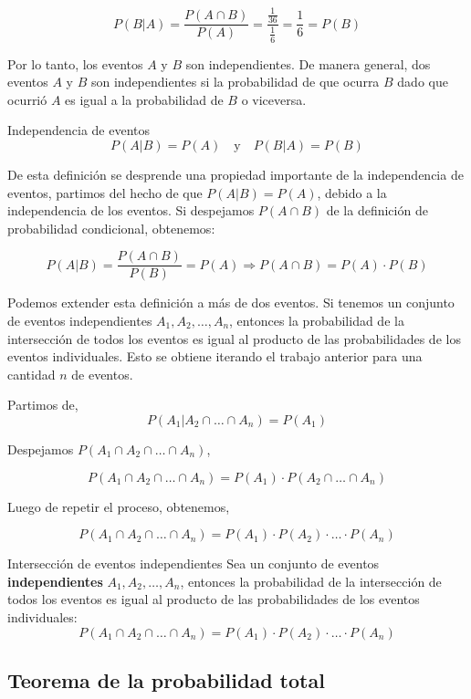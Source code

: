 $$ 
  P(B|A) = \frac{P(A \cap B)}{P(A)} = \frac{\frac{1}{36}}{\frac{1}{6}} = \frac{1}{6} = P(B)
$$

Por lo tanto, los eventos $A$ y $B$ son independientes. De manera general, dos eventos $A$ y $B$ son independientes si la probabilidad de que ocurra $B$ dado que ocurrió $A$ es igual a la probabilidad de $B$ o viceversa. 

\begin{definicion}{Independencia de eventos}
  \[
    P(A|B) = P(A) \quad \text{y} \quad P(B|A) = P(B)
  \]
\end{definicion}

De esta definición se desprende una propiedad importante de la independencia de eventos, partimos del hecho de que $P(A|B) = P(A)$, debido a la independencia de los eventos. Si despejamos $P(A \cap B)$ de la definición de probabilidad condicional, obtenemos:

\[
  P(A|B) = \frac{P(A \cap B)}{P(B)} = P(A) \Rightarrow P(A \cap B) = P(A) \cdot P(B)
\]

Podemos extender esta definición a más de dos eventos. Si tenemos un conjunto de eventos independientes $A_1, A_2, \ldots, A_n$, entonces la probabilidad de la intersección de todos los eventos es igual al producto de las probabilidades de los eventos individuales. Esto se obtiene 
iterando el trabajo anterior para una cantidad $n$ de eventos. 

Partimos de,
\[
  P(A_1|A_2 \cap \ldots \cap A_n) = P(A_1)
\]

Despejamos $P(A_1 \cap A_2 \cap \ldots \cap A_n)$,

\[
  P(A_1 \cap A_2 \cap \ldots \cap A_n) = P(A_1) \cdot P(A_2 \cap \ldots \cap A_n)
\]

Luego de repetir el proceso, obtenemos,

\[
  P(A_1 \cap A_2 \cap \ldots \cap A_n) = P(A_1) \cdot P(A_2) \cdot \ldots \cdot P(A_n)
\]

\begin{definicion}{Intersección de eventos independientes}
  Sea un conjunto de eventos \textbf{independientes} $A_1, A_2, \ldots, A_n$, entonces la probabilidad de la intersección de todos los eventos es igual al producto de las probabilidades de los eventos individuales:
  \[
    P(A_1 \cap A_2 \cap \ldots \cap A_n) = P(A_1) \cdot P(A_2) \cdot \ldots \cdot P(A_n)
  \]
\end{definicion}

\subsection{Teorema de la probabilidad total}

